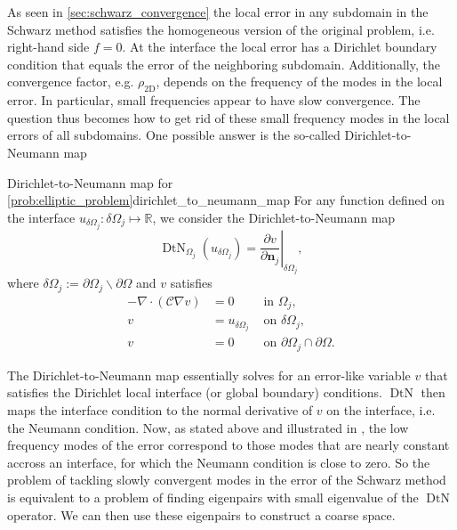 As seen in \cref{sec:schwarz_convergence} the local error in any subdomain in the Schwarz method satisfies the homogeneous version of the original problem, i.e. right-hand side $f = 0$. At the interface the local error has a Dirichlet boundary condition that equals the error of the neighboring subdomain. Additionally, the convergence factor, e.g. $\rho_{\text{2D}}$, depends on the frequency of the modes in the local error. In particular, small frequencies appear to have slow convergence. The question thus becomes how to get rid of these small frequency modes in the local errors of all subdomains. One possible answer is the so-called Dirichlet-to-Neumann map \cite[Definition 5.1]{schwarz_methods_Dolean_2015}
\begin{fancydef}{Dirichlet-to-Neumann map for \cref{prob:elliptic_problem}}{dirichlet_to_neumann_map}
  For any function defined on the interface $u_{\delta\Omega_j}: \delta\Omega_j \mapsto \mathbb{R}$, we consider the Dirichlet-to-Neumann map
  \[
    \operatorname{DtN}_{\Omega_j}\left(u_{\delta\Omega_j}\right)=\left.\frac{\partial v}{\partial \mathbf{n}_j}\right|_{\delta\Omega_j},
  \]
  where $\delta\Omega_j:=\partial \Omega_j \backslash \partial \Omega$ and $v$ satisfies
  \begin{equation}
    \begin{aligned}
      -\nabla\cdot\left(\mathcal{C}\nabla v\right) & =0            & \text { in } \Omega_j,                               \\
      v                                            & =u_{\delta\Omega_j} & \text { on } \delta\Omega_j,                               \\
      v                                            & =0            & \text { on } \partial \Omega_j \cap \partial \Omega.
    \end{aligned}
    \label{eq:dirichlet_to_neumann_map_subproblem}
  \end{equation}
\end{fancydef}

The Dirichlet-to-Neumann map essentially solves for an error-like variable $v$ that satisfies the Dirichlet local interface (or global boundary) conditions. $\operatorname{DtN}$ then maps the interface condition to the normal derivative of $v$ on the interface, i.e. the Neumann condition. Now, as stated above and illustrated in \cite[Figure 5.2]{schwarz_methods_Dolean_2015}, the low frequency modes of the error correspond to those modes that are nearly constant accross an interface, for which the Neumann condition is close to zero. So the problem of tackling slowly convergent modes in the error of the Schwarz method is equivalent to a problem of finding eigenpairs with small eigenvalue of the $\operatorname{DtN}$ operator. We can then use these eigenpairs to construct a coarse space.

